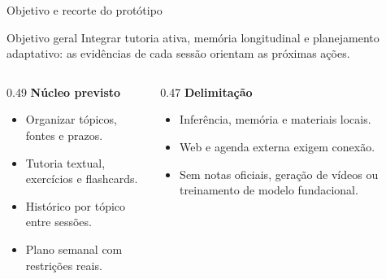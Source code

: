 \documentclass[aspectratio=169,11pt]{beamer}
\begin{document}
\begin{frame}{Objetivo e recorte do protótipo}
  \begin{block}{Objetivo geral}
    Integrar tutoria ativa, memória longitudinal e planejamento adaptativo:
    as evidências de cada sessão orientam as próximas ações.
  \end{block}
  \begin{columns}[T,onlytextwidth]
    \begin{column}{0.49\textwidth}
      \textbf{Núcleo previsto}
      \begin{itemize}
        \item Organizar tópicos, fontes e prazos.
        \item Tutoria textual, exercícios e flashcards.
        \item Histórico por tópico entre sessões.
        \item Plano semanal com restrições reais.
      \end{itemize}
    \end{column}
    \begin{column}{0.47\textwidth}
      \textbf{Delimitação}
      \begin{itemize}
        \item Inferência, memória e materiais locais.
        \item Web e agenda externa exigem conexão.
        \item Sem notas oficiais, geração de vídeos ou treinamento de modelo fundacional.
      \end{itemize}
    \end{column}
  \end{columns}
\end{frame}
\end{document}
